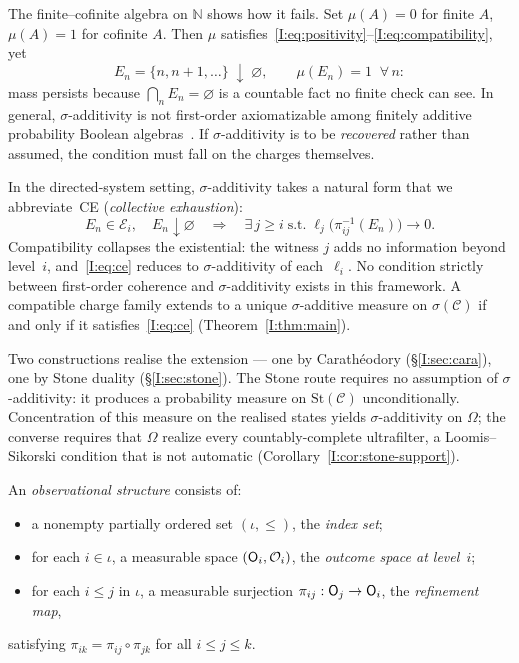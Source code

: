 The finite--cofinite algebra on $\mathbb{N}$ shows how it fails.  Set
$\mu(A) = 0$ for finite $A$, $\mu(A) = 1$ for cofinite $A$.  Then
$\mu$ satisfies~\eqref{I:eq:positivity}--\eqref{I:eq:compatibility},
yet
\[
  E_n = \{n, n{+}1, \ldots\}
  \;\downarrow\; \varnothing,
  \qquad
  \mu(E_n) = 1 \;\;\forall\, n:
\]
mass persists because $\bigcap_n E_n = \varnothing$ is a countable fact
no finite check can see.  In general, $\sigma$-additivity is not
first-order axiomatizable among finitely additive probability Boolean
algebras~\cite{Hoover1978, FaginHalpernMegiddo1990}.
If $\sigma$-additivity is to be \emph{recovered} rather than assumed,
the condition must fall on the charges themselves.

In the directed-system setting, $\sigma$-additivity takes a natural
form that we abbreviate~\textup{CE} (\emph{collective exhaustion}):
\begin{equation}\label{I:eq:ce}
  E_n \in \mathcal{E}_i,\quad
  E_n \downarrow \varnothing
  \quad\Longrightarrow\quad
  \exists\, j \geq i \;\text{s.t.}\;
  \ell_j\!\bigl(\pi_{ij}^{-1}(E_n)\bigr) \to 0.
\end{equation}
Compatibility collapses the existential: the witness $j$ adds no
information beyond level~$i$, and~\eqref{I:eq:ce} reduces to
$\sigma$-additivity of each~$\ell_i$.  No condition strictly between
first-order coherence and $\sigma$-additivity exists in this framework.
A compatible charge family extends to a unique $\sigma$-additive measure
on $\sigma(\mathcal{C})$ if and only if it satisfies~\eqref{I:eq:ce}
(Theorem~\ref{I:thm:main}).

Two constructions realise the extension --- one by Carath\'{e}odory
(\S\ref{I:sec:cara}), one by Stone duality (\S\ref{I:sec:stone}).
The Stone route requires no assumption of $\sigma$-additivity: it
produces a probability measure on
$\mathrm{St}(\mathcal{C})$ unconditionally.  Concentration of this
measure on the realised states yields $\sigma$-additivity on $\Omega$;
the converse requires that $\Omega$ realize every countably-complete
ultrafilter, a Loomis--Sikorski condition that is not automatic
(Corollary~\ref{I:cor:stone-support}).

\begin{definition}
\label{I:def:obs-structure}
An \emph{observational structure} consists of:
\begin{itemize}[noitemsep]
  \item a nonempty partially ordered set $(\iota, \leq)$, the \emph{index set};
  \item for each $i \in \iota$, a measurable space $(\mathsf{O}_{i}, \mathcal{O}_i)$,
    the \emph{outcome space at level~$i$};
  \item for each $i \leq j$ in $\iota$, a measurable surjection
    $\pi_{ij} : \mathsf{O}_{j} \to \mathsf{O}_{i}$, the \emph{refinement map},
\end{itemize}
satisfying $\pi_{ik} = \pi_{ij} \circ \pi_{jk}$ for all $i \leq j \leq k$.
\end{definition}

